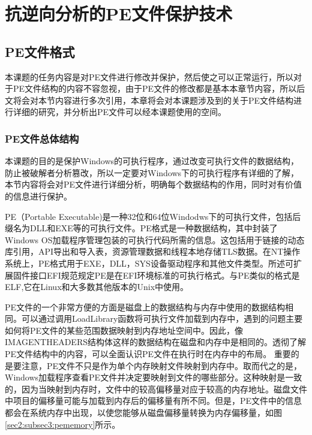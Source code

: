 \chapter{抗逆向分析的PE文件保护技术}
\label{cha:sensorsys}

\section{PE文件格式}
\label{cha2:sec:PEfile}

本课题的任务内容是对PE文件进行修改并保护\cite{2017Compiler}，然后使之可以正常运行，所以对于PE文件结构的内容不容忽视，由于PE文件的修改都是基本本章节内容，所以后文将会对本节内容进行多次引用，本章将会对本课题涉及到的关于PE文件结构进行详细的研究，并分析出PE文件可以经本课题使用的空间。
\subsection{PE文件总体结构}
本课题的目的是保护Windows的可执行程序，通过改变可执行文件的数据结构，防止被破解者分析篡改，所以一定要对Windows下的可执行程序有详细的了解，本节内容将会对PE文件进行详细分析，明确每个数据结构的作用，同时对有价值的信息进行保护\cite{2017A}。

PE（Portable Executable)是一种32位和64位Windodws下的可执行文件，包括后缀名为DLL和EXE等的可执行文件。PE格式是一种数据结构，其中封装了Windows OS加载程序管理包装的可执行代码所需的信息。这包括用于链接的动态库引用\cite{2018c}，API导出和导入表，资源管理数据和线程本地存储TLS数据。在NT操作系统上，PE格式用于EXE，DLL，SYS设备驱动程序和其他文件类型。所述可扩展固件接口EFI规范规定PE是在EFI环境标准的可执行格式\cite{2018VMGuards}。与PE类似的格式是ELF,它在Linux和大多数其他版本的Unix中使用。
	
PE文件的一个非常方便的方面是磁盘上的数据结构与内存中使用的数据结构相同。可以通过调用LoadLibrary函数将可执行文件加载到内存中，遇到的问题主要如何将PE文件的某些范围数据映射到内存地址空间中。因此，像IMAGE\textunderscore NT\textunderscore HEADERS结构体这样的数据结构在磁盘和内存中是相同的。透彻了解PE文件结构中的内容，可以全面认识PE文件在执行时在内存中的布局\cite{2016Design}。
重要的是要注意，PE文件不只是作为单个内存映射文件映射到内存中。取而代之的是，Windows加载程序查看PE文件并决定要映射到文件的哪些部分。这种映射是一致的，因为当映射到内存时，文件中的较高偏移量对应于较高的内存地址。磁盘文件中项目的偏移量可能与加载到内存后的偏移量有所不同。但是，PE文件中的信息都会在系统内存中出现\cite{李路鹿2020代码混淆技术研究综述}，以使您能够从磁盘偏移量转换为内存偏移量，如图\ref{sec2:subsec3:pememory}所示。

